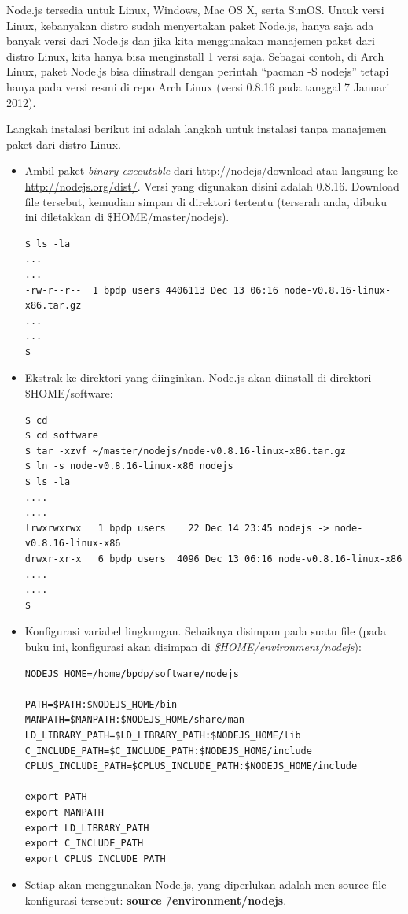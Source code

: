 Node.js tersedia untuk Linux, Windows, Mac OS X, serta SunOS. Untuk versi Linux, kebanyakan distro sudah menyertakan paket Node.js, hanya saja ada banyak versi dari Node.js dan jika kita menggunakan manajemen paket dari distro Linux, kita hanya bisa menginstall 1 versi saja. Sebagai contoh, di Arch Linux, paket Node.js bisa diinstrall dengan perintah ``pacman -S nodejs'' tetapi hanya pada versi resmi di repo Arch Linux (versi 0.8.16 pada tanggal 7 Januari 2012). 

Langkah instalasi berikut ini adalah langkah untuk instalasi tanpa manajemen paket dari distro Linux.
\begin{itemize}
  \item Ambil paket \textit{binary executable} dari \url{http://nodejs/download} atau langsung ke \url{http://nodejs.org/dist/}. Versi yang digunakan disini adalah 0.8.16. Download file tersebut, kemudian simpan di direktori tertentu (terserah anda, dibuku ini diletakkan di \$HOME/master/nodejs).

\lstset{language=bash,caption=Hasil dari download Node.js}
\begin{lstlisting}
$ ls -la
...
...
-rw-r--r--  1 bpdp users 4406113 Dec 13 06:16 node-v0.8.16-linux-x86.tar.gz
...
...
$ 
\end{lstlisting}

  \item Ekstrak ke direktori yang diinginkan. Node.js akan diinstall di direktori \$HOME/software:

\lstset{language=bash,caption=Ekstraksi Node.js}
\begin{lstlisting}
$ cd 
$ cd software
$ tar -xzvf ~/master/nodejs/node-v0.8.16-linux-x86.tar.gz
$ ln -s node-v0.8.16-linux-x86 nodejs
$ ls -la
....
....
lrwxrwxrwx   1 bpdp users    22 Dec 14 23:45 nodejs -> node-v0.8.16-linux-x86
drwxr-xr-x   6 bpdp users  4096 Dec 13 06:16 node-v0.8.16-linux-x86
....
....
$ 
\end{lstlisting}

  \item Konfigurasi variabel lingkungan. Sebaiknya disimpan pada suatu file (pada buku ini, konfigurasi akan disimpan di \textit{\$HOME/environment/nodejs}):

\lstset{language=bash,caption=Konfigurasi variabel lingkungan Node.js}
\begin{lstlisting}
NODEJS_HOME=/home/bpdp/software/nodejs
 
PATH=$PATH:$NODEJS_HOME/bin
MANPATH=$MANPATH:$NODEJS_HOME/share/man
LD_LIBRARY_PATH=$LD_LIBRARY_PATH:$NODEJS_HOME/lib
C_INCLUDE_PATH=$C_INCLUDE_PATH:$NODEJS_HOME/include
CPLUS_INCLUDE_PATH=$CPLUS_INCLUDE_PATH:$NODEJS_HOME/include
 
export PATH
export MANPATH
export LD_LIBRARY_PATH
export C_INCLUDE_PATH
export CPLUS_INCLUDE_PATH
\end{lstlisting}

  \item Setiap akan menggunakan Node.js, yang diperlukan adalah men-source file konfigurasi tersebut: \textbf{source \~/environment/nodejs}.
\end{itemize}

